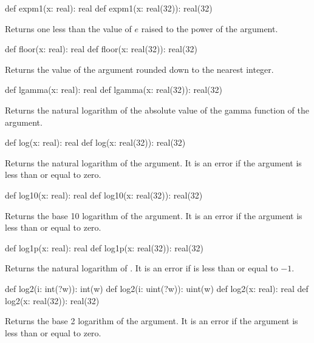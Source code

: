 \begin{protohead}
def expm1(x: real): real
def expm1(x: real(32)): real(32)
\end{protohead}
\begin{protobody}
Returns one less than the value of $e$ raised to the power of the argument.
\end{protobody}

\begin{protohead}
def floor(x: real): real
def floor(x: real(32)): real(32)
\end{protohead}
\begin{protobody}
Returns the value of the argument rounded down to the nearest integer.
\end{protobody}

\begin{protohead}
def lgamma(x: real): real
def lgamma(x: real(32)): real(32)
\end{protohead}
\begin{protobody}
Returns the natural logarithm of the absolute value of the gamma
function of the argument.
\end{protobody}

\begin{protohead}
def log(x: real): real
def log(x: real(32)): real(32)
\end{protohead}
\begin{protobody}
Returns the natural logarithm of the argument.  It is an error if the
argument is less than or equal to zero.
\end{protobody}

\begin{protohead}
def log10(x: real): real
def log10(x: real(32)): real(32)
\end{protohead}
\begin{protobody}
Returns the base 10 logarithm of the argument.  It is an error if the
argument is less than or equal to zero.
\end{protobody}

\begin{protohead}
def log1p(x: real): real
def log1p(x: real(32)): real(32)
\end{protohead}
\begin{protobody}
Returns the natural logarithm of .  It is an error
if  is less than or equal to $-1$.
\end{protobody}

\begin{protohead}
def log2(i: int(?w)): int(w)
def log2(i: uint(?w)): uint(w)
def log2(x: real): real
def log2(x: real(32)): real(32)
\end{protohead}
\begin{protobody}
Returns the base 2 logarithm of the argument.  It is an error if the
argument is less than or equal to zero.
\end{protobody}

